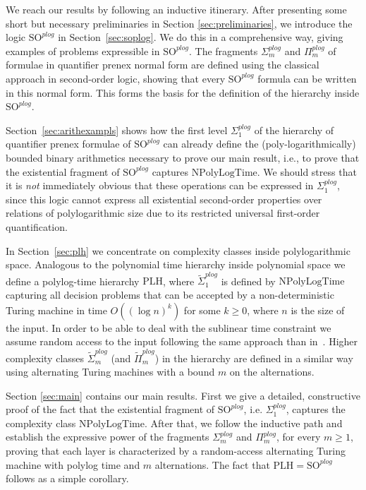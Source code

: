 \documentclass{article}
\newcommand{\npolylog}{\mathrm{NPolyLogTime}}
\begin{document}
We reach our results by following an inductive itinerary. After presenting some short but necessary preliminaries in Section \ref{sec:preliminaries}, we introduce the logic $\mathrm{SO}^{\mathit{plog}}$ in Section~\ref{sec:soplog}. We do this in a comprehensive way, giving examples of problems expressible in $\mathrm{SO}^{\mathit{plog}}$. The fragments $\Sigma^{\mathit{plog}}_m$ and $\Pi^{\mathit{plog}}_m$ of formulae in quantifier prenex normal form are defined using the classical approach in second-order logic, showing that every $\mathrm{SO}^{\mathit{plog}}$ formula can be written in this normal form. This forms the basis for the definition of the hierarchy inside $\mathrm{SO}^{\mathit{plog}}$. 

Section~\ref{sec:arithexampls} shows how the first level $\Sigma^{\mathit{plog}}_1$ of the hierarchy of quantifier prenex formulae of $\mathrm{SO}^{\mathit{plog}}$ can already define the (poly-logarithmically) bounded binary arithmetics necessary to prove our main result, i.e., to prove that the existential fragment of $\mathrm{SO}^{\mathit{plog}}$ captures $\npolylog$. We should stress that it is \emph{not} immediately obvious that these operations can be expressed in $\Sigma^{\mathit{plog}}_1$, since this logic cannot express all existential second-order properties over relations of polylogarithmic size due to its restricted universal first-order quantification.

In Section~\ref{sec:plh} we concentrate on complexity classes inside polylogarithmic space. Analogous to the polynomial time hierarchy inside polynomial space we define a polylog-time hierarchy $\mathrm{PLH}$, where $\tilde{\Sigma}_1^{\mathit{plog}}$ is defined by $\npolylog$ capturing all decision problems that can be accepted by a non-deterministic Turing machine in time $O((\log n)^k)$ for some $k \ge 0$, where $n$ is the size of the input. In order to be able to deal with the sublinear time constraint we assume random access to the input following the same approach than in~\cite{barrington:jcss1990}. Higher complexity classes $\tilde{\Sigma}_m^{\mathit{plog}}$ (and $\tilde{\Pi}_m^{\mathit{plog}}$) in the hierarchy are defined in a similar way using alternating Turing machines with a bound $m$ on the alternations.


Section \ref{sec:main} contains our main results. First we give a detailed, constructive proof of the fact that the existential fragment of $\mathrm{SO}^{\mathit{plog}}$, i.e. $\Sigma^{\mathit{plog}}_1$, captures the complexity class $\npolylog$. After that, we follow the inductive path and establish the expressive power of the fragments $\Sigma^{\mathit{plog}}_m$ and $\Pi^{\mathit{plog}}_m$, for every $m \geq 1$, proving that each layer is characterized by a random-access alternating Turing machine with polylog time and $m$ alternations. The fact that $\mathrm{PLH} = \mathrm{SO}^{\mathit{plog}}$ follows as a simple corollary.
\end{document}
